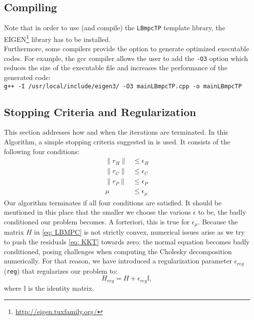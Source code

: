 \documentclass[letter]{article}
\begin{document}
\begin{sffamily}
\subsection{Compiling}
Note that in order to use (and compile) the \texttt{LBmpcTP} template library, the EIGEN\footnote{\url{http://eigen.tuxfamily.org/}} library has to be installed.\\

\noindent
Furthermore, some compilers provide the option to generate optimized executable codes. For example, the gcc compiler allows the user to add the \texttt{-O3} option which  reduces the size of the executable file and increases the performance of the generated code: \\
\noindent
\texttt{g++ -I /usr/local/include/eigen3/ -O3 mainLBmpcTP.cpp -o mainLBmpcTP}

\subsection{Stopping Criteria and Regularization}
This section addresses how and when the iterations are terminated. In this Algorithm, a simple stopping criteria suggested in \citep{Jorgensen2006, Krueth2008, Boyd2004ConvOpt} is used. It consists of the following four conditions:
\begin{align}
\label{eq: stoppingCriteria}
	\|r_H\| &\leq \epsilon_H \\
	\|r_C\| &\leq \epsilon_C	\nonumber \\
	\|r_P\| &\leq \epsilon_P	\nonumber  \\
	\mu &\leq \epsilon_\mu \nonumber 
\end{align}
Our algorithm terminates if all four conditions are satisfied. It should be mentioned in this place that the smaller we choose the various $\epsilon$ to be, the badly conditioned our problem becomes. A forteriori, this is true for $\epsilon_\mu$. Because the matrix $H$ in \eqref{eq: LBMPC} is not strictly convex, numerical issues arise as we try to push the residuals \eqref{eq: KKT} towards zero: the normal equation becomes badly conditioned, posing challenges when computing the Cholesky decomposition numerically. For that reason, we have introduced a regularization parameter $\epsilon_{reg}$ (\texttt{reg}) that regularizes our problem to:
\begin{equation}
\label{eq: regularization}
	H_{reg} = H + \epsilon_{reg}\mathbb{I},
\end{equation}
where $\mathbb{I}$ is the identity matrix.


\end{sffamily}
\end{document}

